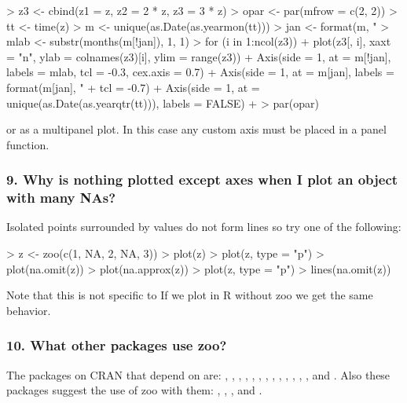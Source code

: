 \documentclass{Z}
\newcommand{\mysection}[1]{\subsubsection[#1]{\textbf{#1}}}
\begin{document}
\begin{Schunk}
\begin{Sinput}
> z3 <- cbind(z1 = z, z2 = 2 * z, z3 = 3 * z)
> opar <- par(mfrow = c(2, 2))
> tt <- time(z)
> m <- unique(as.Date(as.yearmon(tt)))
> jan <- format(m, "%
> mlab <- substr(months(m[!jan]), 1, 1)
> for (i in 1:ncol(z3)) {
+     plot(z3[, i], xaxt = "n", ylab = colnames(z3)[i], ylim = range(z3))
+     Axis(side = 1, at = m[!jan], labels = mlab, tcl = -0.3, cex.axis = 0.7)
+     Axis(side = 1, at = m[jan], labels = format(m[jan], "%
+         tcl = -0.7)
+     Axis(side = 1, at = unique(as.Date(as.yearqtr(tt))), labels = FALSE)
+ }
> par(opar)
\end{Sinput}
\end{Schunk}

or as a multipanel plot.  In this case any custom axis must be
placed in a panel function.

\begin{Schunk}
\end{Schunk}

\mysection{9.  Why is nothing plotted except axes when I plot an 
object with many NAs?}

Isolated points surrounded by  values do not form lines 
so try one of the following:

\begin{Schunk}
\begin{Sinput}
> z <- zoo(c(1, NA, 2, NA, 3))
> plot(z)
> plot(z, type = "p")
> plot(na.omit(z))
> plot(na.approx(z))
> plot(z, type = "p")
> lines(na.omit(z))
\end{Sinput}
\end{Schunk}

Note that this is not specific to   If we
plot in R without zoo we get the same behavior.

\mysection{10. What other packages use zoo?}

The packages on CRAN that depend on  are: , , , , , , , , , , , , ,  and .  Also these packages suggest the use of zoo with them: , , ,  and .
\end{document}
